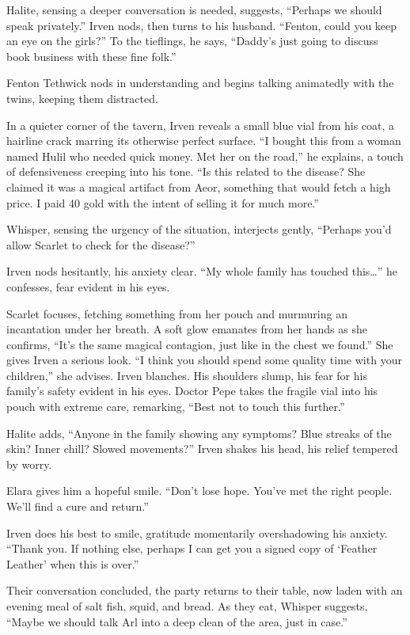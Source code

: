 \documentclass[
  letterpaper,12pt,twoside,twocolumn,openany,
  nodeprecatedcode,bg=full]{dndbook}
\begin{document}
Halite, sensing a deeper conversation is needed, suggests, ``Perhaps we
should speak privately.'' Irven nods, then turns to his husband.
``Fenton, could you keep an eye on the girls?'' To the tieflings, he
says, ``Daddy's just going to discuss book business with these fine
folk.''

Fenton Tethwick nods in understanding and begins talking animatedly with
the twins, keeping them distracted.

In a quieter corner of the tavern, Irven reveals a small blue vial from
his coat, a hairline crack marring its otherwise perfect surface. ``I
bought this from a woman named Hulil who needed quick money. Met her on
the road,'' he explains, a touch of defensiveness creeping into his
tone. ``Is this related to the disease? She claimed it was a magical
artifact from Aeor, something that would fetch a high price. I paid 40
gold with the intent of selling it for much more.''

Whisper, sensing the urgency of the situation, interjects gently,
``Perhaps you'd allow Scarlet to check for the disease?''

Irven nods hesitantly, his anxiety clear. ``My whole family has touched
this\ldots{}'' he confesses, fear evident in his eyes.

Scarlet focuses, fetching something from her pouch and murmuring an
incantation under her breath. A soft glow emanates from her hands as she
confirms, ``It's the same magical contagion, just like in the chest we
found.'' She gives Irven a serious look. ``I think you should spend some
quality time with your children,'' she advises. Irven blanches. His
shoulders slump, his fear for his family's safety evident in his eyes.
Doctor Pepe takes the fragile vial into his pouch with extreme care,
remarking, ``Best not to touch this further.''

Halite adds, ``Anyone in the family showing any symptoms? Blue streaks
of the skin? Inner chill? Slowed movements?'' Irven shakes his head, his
relief tempered by worry.

Elara gives him a hopeful smile. ``Don't lose hope. You've met the right
people. We'll find a cure and return.''

Irven does his best to smile, gratitude momentarily overshadowing his
anxiety. ``Thank you. If nothing else, perhaps I can get you a signed
copy of `Feather Leather' when this is over.''

Their conversation concluded, the party returns to their table, now
laden with an evening meal of salt fish, squid, and bread. As they eat,
Whisper suggests, ``Maybe we should talk Arl into a deep clean of the
area, just in case.''
\end{document}
